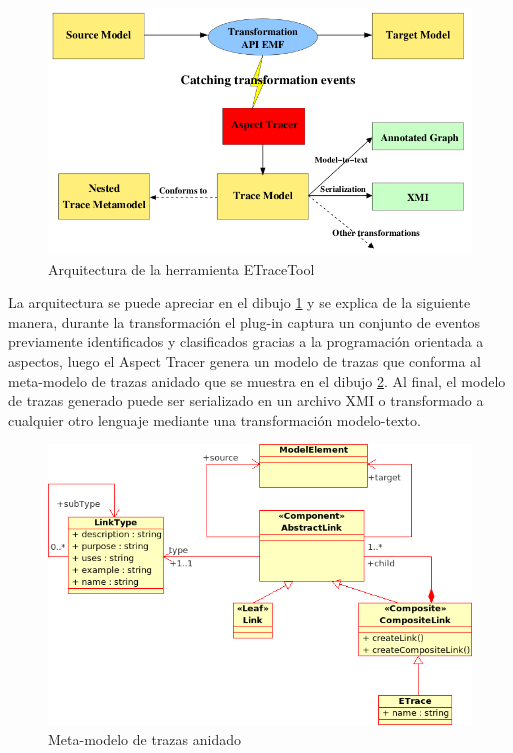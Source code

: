 \documentclass[a4paper,12pt,oneside]{book}
\begin{document}
\begin{figure}[hbtp]
\centering
\includegraphics[scale=0.5]{./img/ETraceTool_Arquitectura}
\caption{Arquitectura de la herramienta ETraceTool}
\label{fig:ArqETraceTool}
\end{figure}

La arquitectura se puede apreciar en el dibujo \ref{fig:ArqETraceTool} y se explica de la siguiente manera, durante la transformación el plug-in captura un conjunto de eventos previamente identificados y clasificados gracias a la programación orientada a aspectos, luego el Aspect Tracer genera un modelo de trazas que conforma al meta-modelo de trazas anidado que se muestra en el dibujo \ref{fig:ETraceToolMeta-modelo}. Al final, el modelo de trazas generado puede ser serializado en un archivo XMI o transformado a cualquier otro lenguaje mediante una transformación modelo-texto.

\begin{figure}[hbtp]
\centering
\includegraphics[scale=0.6]{./img/NestedTraceMetamodel}
\caption{Meta-modelo de trazas anidado}
\label{fig:ETraceToolMeta-modelo}
\end{figure}
\end{document}
